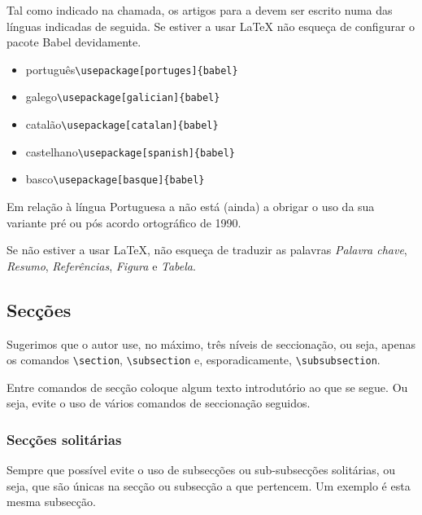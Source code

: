 \documentclass[a4paper, twocolumn, 11pt, twoside]{article}
\begin{document}
Tal como indicado na chamada, os artigos para a \linguamatica{} devem
ser escrito numa das línguas indicadas de seguida. Se estiver a usar
\LaTeX{} não esqueça de configurar o pacote Babel devidamente.
\begin{itemize}
\item português\hfill\verb.\usepackage[portuges]{babel}.
\item galego\hfill\verb.\usepackage[galician]{babel}.
\item catalão\hfill\verb.\usepackage[catalan]{babel}.
\item castelhano\hfill\verb.\usepackage[spanish]{babel}.
\item basco\hfill\verb.\usepackage[basque]{babel}.
\end{itemize}
Em relação à língua Portuguesa a \linguamatica{} não está (ainda) a
obrigar o uso da sua variante pré ou pós acordo ortográfico de 1990.

Se não estiver a usar \LaTeX{}, não esqueça de traduzir as palavras
\emph{Palavra chave}, \emph{Resumo}, \emph{Referências},
\emph{Figura} e \emph{Tabela}.

\subsection{Secções}

Sugerimos que o autor use, no máximo, três níveis de seccionação, ou
seja, apenas os comandos \verb.\section., \verb.\subsection. e,
esporadicamente, \verb.\subsubsection..

Entre comandos de secção coloque algum texto introdutório ao que se
segue. Ou seja, evite o uso de vários comandos de seccionação
seguidos.

\subsubsection{Secções solitárias}

Sempre que possível evite o uso de subsecções ou sub-subsecções
solitárias, ou seja, que são únicas na secção ou subsecção a que
pertencem. Um exemplo é esta mesma subsecção.
\end{document}
